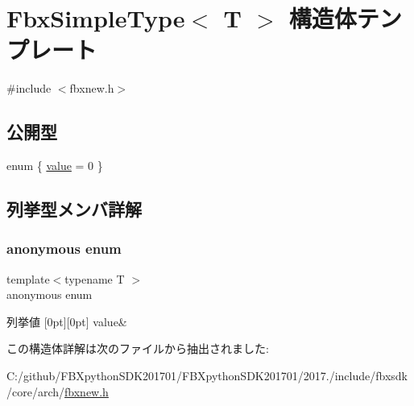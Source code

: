 \hypertarget{struct_fbx_simple_type}{}\section{Fbx\+Simple\+Type$<$ T $>$ 構造体テンプレート}
\label{struct_fbx_simple_type}


{\ttfamily \#include $<$fbxnew.\+h$>$}

\subsection*{公開型}
\begin{DoxyCompactItemize}
\item 
enum \{ \hyperlink{struct_fbx_simple_type_a747f3fbe3f4a82173bf2b4175e9ff3b8ad40f5f2bb903bccac4fda9add1925e2f}{value} = 0
 \}
\end{DoxyCompactItemize}


\subsection{列挙型メンバ詳解}
\mbox{\label{struct_fbx_simple_type_a747f3fbe3f4a82173bf2b4175e9ff3b8}} 
\subsubsection{\texorpdfstring{anonymous enum}{anonymous enum}}
{\footnotesize\ttfamily template$<$typename T $>$ \\
anonymous enum}

\begin{DoxyEnumFields}{列挙値}
[0pt][0pt]{}\mbox{\label{struct_fbx_simple_type_a747f3fbe3f4a82173bf2b4175e9ff3b8ad40f5f2bb903bccac4fda9add1925e2f}} 
value&\\
\hline

\end{DoxyEnumFields}


この構造体詳解は次のファイルから抽出されました\+:\begin{DoxyCompactItemize}
\item 
C\+:/github/\+F\+B\+Xpython\+S\+D\+K201701/\+F\+B\+Xpython\+S\+D\+K201701/2017./include/fbxsdk/core/arch/\hyperlink{fbxnew_8h}{fbxnew.\+h}\end{DoxyCompactItemize}
